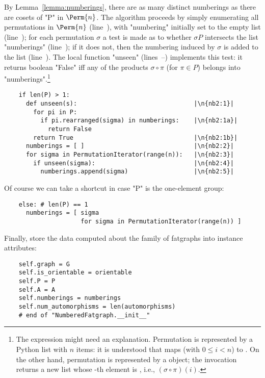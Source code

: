 By Lemma~\ref{lemma:numberings}, there are as many distinct numberings
as there are cosets of "P" in $\Perm{n}$.  The algorithm proceeds by
simply enumerating all permutations in $\Perm{n}$ (line~),
with "numbering" initially set to the empty list (line~);
for each permutation $\sigma$ a test is made as to whether $\sigma P$
intersects the list "numberings" (line~); if it does not,
then the numbering induced by $\sigma$ is added to the list
(line~).  The local function "unseen"
(lines~--) implements this test: it returns
boolean "False" iff any of the products $\sigma \circ \pi$ (for $\pi
\in P$) belongs into "numberings".\footnote{The expression
   might need an explanation.  Permutation
   is represented by a Python list with $n$ items: it is
  understood that  maps  (with $0 \leq i < n$) to
  .  On the other hand, permutation  is represented
  by a  object; the  invocation
  returns a new list whose -th element is , i.e.,
  $(\sigma \circ \pi) (i)$.}
\begin{lstlisting}
    if len(P) > 1:
      def unseen(s):                                |\n{nb2:1}| 
        for pi in P:
          if pi.rearranged(sigma) in numberings:    |\n{nb2:1a}|
            return False
        return True                                 |\n{nb2:1b}|
      numberings = [ ]                              |\n{nb2:2}|
      for sigma in PermutationIterator(range(n)):   |\n{nb2:3}|
        if unseen(sigma):                           |\n{nb2:4}|
          numberings.append(sigma)                  |\n{nb2:5}|

\end{lstlisting}
Of course we can take a shortcut in case "P" is the one-element group:
\begin{lstlisting}
    else: # len(P) == 1
      numberings = [ sigma 
                     for sigma in PermutationIterator(range(n)) ]

\end{lstlisting}

Finally, store the data computed about the family of fatgraphs into
instance attributes:
\begin{lstlisting}
    self.graph = G
    self.is_orientable = orientable
    self.P = P
    self.A = A
    self.numberings = numberings
    self.num_automorphisms = len(automorphisms)
    # end of "NumberedFatgraph.__init__"

\end{lstlisting}

